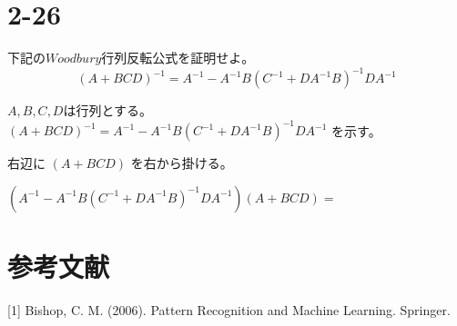 \documentclass{ltjsarticle}
\renewenvironment{leftbar}{%
  \renewcommand\FrameCommand{\vrule width 1pt \hspace{10pt}}%
  \MakeFramed {\advance\hsize-\width \FrameRestore}}%
 {\endMakeFramed}
\newcommand{\barquo}[1]{\begin{leftbar} \noindent #1 \end{leftbar}} %
\begin{document}
\section*{2-26}

\barquo{
下記の$Woodbury$行列反転公式を証明せよ。\\
$$
(A + BCD)^{-1} 
=  A^{-1} -  A^{-1}B (C^{-1} + D A^{-1} B)^{-1} D A^{-1}
$$
}


$A,B,C,D$は行列とする。\\
$
(A + BCD)^{-1} 
=  A^{-1} -  A^{-1}B (C^{-1} + D A^{-1} B)^{-1} D A^{-1}
$
を示す。

右辺に
$
(A + BCD)
$
を右から掛ける。

$
(A^{-1} -  A^{-1}B (C^{-1} + D A^{-1} B)^{-1} D A^{-1}) (A + BCD)
= 
$












\section*{参考文献}
[1] Bishop, C. M. (2006). Pattern Recognition and Machine Learning. Springer.
\end{document}

